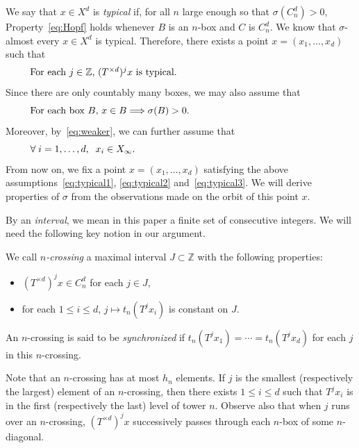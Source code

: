 \documentclass[AHL,Unicode,longabstracts]{cedram}
\newcommand{\ZZ}{\mathbb{Z}}
\newcommand{\cd}{C^{d}}
\newcommand{\td}{T^{\times d}}
\let\oldforall\forall
\renewcommand*{\forall}{\mathrel{\oldforall}}
\begin{document}
We say that $x\in X^d$ is \emph{typical} if, for all $n$ large enough so that $\sigma(\cd_n)>0$, Property~\eqref{eq:Hopf} holds whenever $B$ is an $n$-box and $C$ is $\cd_n$. We know that $\sigma$-almost every $x\in X^d$ is typical. Therefore, there exists a point $x=(x_1,\ldots,x_d)$ such that
\begin{equation}\label{eq:typical1}
\begin{minipage}[t]{0.9\textwidth}
For each $j\in\ZZ$, $(\td)^jx$ is typical.
\end{minipage}
\end{equation}
Since there are only countably many boxes, we may also assume that
\begin{equation}\label{eq:typical2}
\begin{minipage}[t]{0.9\textwidth}
For each box $B$, $x\in B\Longrightarrow\sigma(B)>0$.
\end{minipage}
\end{equation}
Moreover, by~\eqref{eq:weaker}, we can further assume that
\begin{equation}\label{eq:typical3}
\begin{minipage}[t]{0.9\textwidth}
$\forall i=1,\ldots,d,\;\; x_i\in X_\infty.$
\end{minipage}
\end{equation}
From now on, we fix a point $x=(x_1,\ldots,x_d)$ satisfying the above assumptions~\eqref{eq:typical1}, \eqref{eq:typical2} and~\eqref{eq:typical3}. We will derive properties of $\sigma$ from the observations made on the orbit of this point $x$.

By an \emph{interval}, we mean in this paper a finite set of consecutive integers. We will need the following key notion in our argument.
\begin{defi}\label{def:ncrossing}
We call \emph{$n$-crossing} a maximal interval $J\subset \ZZ$ with the following properties:
\begin{itemize}
\item $(\td)^j x\in \cd_n$ for each $j\in J$,
\item for each $1\le i\le d$, $j\mapsto t_n(T^jx_i)$ is constant on $J$.
\end{itemize}
An $n$-crossing is said to be \emph{synchronized} if $t_n(T^jx_1)=\cdots=t_n(T^jx_d)$ for each $j$ in this $n$-crossing.
\end{defi}

Note that an $n$-crossing has at most $h_n$ elements. If $j$ is the smallest (respectively the largest) element of an $n$-crossing, then there exists $1\le i\le d$ such that $T^{j}x_i$ is in the first (respectively the last) level of tower $n$. Observe also that when $j$ runs over an $n$-crossing, $(\td)^j x$ successively passes through each $n$-box of some $n$-diagonal.
\end{document}
